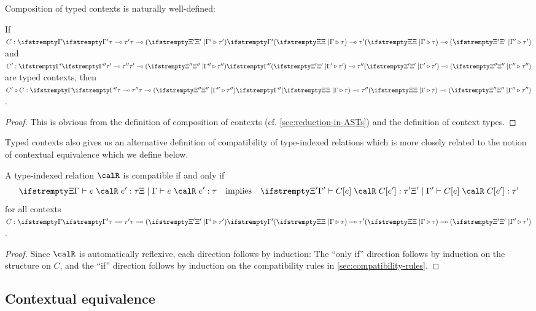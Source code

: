 Composition of typed contexts is naturally well-defined:

\begin{lemma}
    \label{lem:context-type-composition}
    If $\ctxhastype{C}{\Xi}{\Gamma}{\tau}{\Xi'}{\Gamma'}{\tau'}$ and $\ctxhastype{C'}{\Xi'}{\Gamma'}{\tau'}{\Xi''}{\Gamma''}{\tau''}$ are typed contexts, then $\ctxhastype{C' \circ C}{\Xi}{\Gamma}{\tau}{\Xi''}{\Gamma''}{\tau''}$.
\end{lemma}

\begin{proof}
    This is obvious from the definition of composition of contexts (cf. \cref{sec:reduction-in-ASTs}) and the definition of context types.
\end{proof}


%
Typed contexts also gives us an alternative definition of compatibility of type-indexed relations which is more closely related to the notion of contextual equivalence which we define below.

\begin{lemma}
    \label{lem:compatibility-equivalent-property}
    A type-indexed relation $\calR$ is compatible if and only if
    \begin{equation*}
        \typeindrel{\Xi}{\Gamma}{e}{\calR}{e'}{\tau}
        \quad \text{implies} \quad
        \typeindrel{\Xi'}{\Gamma'}{C[e]}{\calR}{C[e']}{\tau'}
    \end{equation*}
    for all contexts $\ctxhastype{C}{\Xi}{\Gamma}{\tau}{\Xi'}{\Gamma'}{\tau'}$.
\end{lemma}

\begin{proof}
    Since $\calR$ is automatically reflexive, each direction follows by induction: The \enquote{only if} direction follows by induction on the structure on $C$, and the \enquote{if} direction follows by induction on the compatibility rules in \cref{sec:compatibility-rules}.
\end{proof}


\subsection{Contextual equivalence}\label{sec:contextual-equivalence}

\newcommand{\ctxequivrel}{\cong^{\mathit{ctx}}}
\newcommand{\ctxequiv}[5]{%
    \ifstrempty{#1}{%
        #2 \vdash #3 \ctxequivrel #4 : #5
    }{%
        #1 \mid #2 \vdash #3 \ctxequivrel #4 : #5
    }%
}


